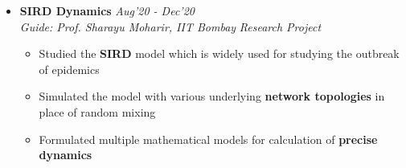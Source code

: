 \documentclass[10pt,letterpaper,sans]{moderncv}
\providecommand{\sl}{\slshape}
\begin{document}
\begin{itemize}
\begin{itemize}
\item Added VIBE and MediaPipe to the pose extraction backend of the plugin
\item Explored a \textbf{self-supervised} graph neural network framework for dynamic mapping of animations from source to dissimilar target skeletons
\end{itemize}
\vspace{5pt}
\item \textbf{SIRD Dynamics} \hfill{\sl Aug'20 - Dec'20}\\
\textit{Guide: Prof. Sharayu Moharir, IIT Bombay} \hfill{\sl Research Project}\\
\vspace{-10pt}
\begin{itemize}
\item Studied the \textbf{SIRD} model which is widely used for studying the outbreak of epidemics
\item Simulated the model with various underlying \textbf{network topologies} in place of random mixing
\item Formulated multiple mathematical models for calculation of \textbf{precise dynamics}
\end{itemize}

\end{itemize}
\vspace{-10pt}
\end{document}
